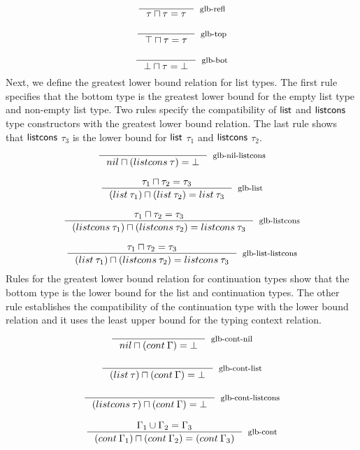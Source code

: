 \documentclass[review]{elsarticle}
\theoremstyle{definition}
\newcommand{\Con}[1]{\red{\mathsf{#1}}}
\begin{document}
\[
\begin{array}{c}
  \inference{}{\tau \sqcap \tau = \tau}[glb-refl] \\ \\
  \inference{}{\top \sqcap \tau = \tau}[glb-top] \\ \\
  \inference{}{\bot \sqcap \tau = \bot}[glb-bot]
\end{array}
\]
Next, we define the greatest lower bound relation for list types. The first rule specifies that the bottom
type is the greatest lower bound for the empty list type and non-empty list type. Two rules specify the
compatibility of \ensuremath{\Con{list}} and \ensuremath{\Con{listcons}} type constructors with the greatest lower bound relation. The last
rule shows that \ensuremath{\Con{listcons}} $\tau_3$ is the lower bound for \ensuremath{\Con{list}} $\tau_1$ and \ensuremath{\Con{listcons}} $\tau_2$.
\[
\begin{array}{c}
  \inference{}{nil \sqcap (listcons\: \tau) = \bot}[glb-nil-listcons] \\ \\
  \inference{\tau_1\sqcap \tau_2 = \tau_3}
            {(list\: \tau_1)\sqcap (list\:\tau_2) = list\:\tau_3}
            [glb-list]\\ \\
   \inference{\tau_1\sqcap \tau_2 = \tau_3}
             {(listcons\: \tau_1)\sqcap (listcons\:\tau_2) = listcons\:\tau_3}
             [glb-listcons] \\ \\

   \inference{\tau_1\sqcap \tau_2 = \tau_3}
             {(list\: \tau_1)\sqcap (listcons\:\tau_2) = listcons\:\tau_3}
             [glb-list-listcons]
\end{array}
\]
Rules for the greatest lower bound relation for continuation types show that the bottom type is the
lower bound for the list and continuation types. The other rule establishes the compatibility of
the continuation type with the lower bound relation and it uses the least upper bound for the typing
context relation.
\[
\begin{array}{c}
  \inference{}{nil\sqcap(cont\:\Gamma) = \bot}[glb-cont-nil] \\ \\
  \inference{}{(list\:\tau)\sqcap(cont\:\Gamma) = \bot}[glb-cont-list] \\ \\
  \inference{}{(listcons\:\tau)\sqcap(cont\:\Gamma) = \bot}[glb-cont-listcons] \\ \\
  \inference{\Gamma_1\cup\Gamma_2 = \Gamma_3}
            {(cont\:\Gamma_1)\sqcap(cont\:\Gamma_2) = (cont\:\Gamma_3)}
            [glb-cont]
\end{array}
\]
\end{document}
